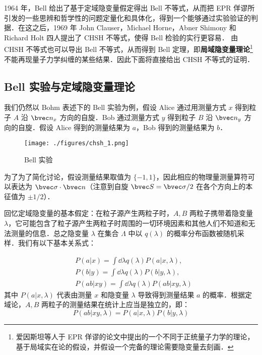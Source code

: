 

1964 年，Bell 给出了基于定域隐变量假定得出 Bell 不等式，从而把 EPR 佯谬所引发的一些思辨和哲学性的问题定量化和具体化，得到一个能够通过实验验证的判据．在这之后，1969 年 John Clauser，Michael Horne，Abner Shimony 和 Richard Holt 四人提出了 CHSH 不等式，使得 Bell 检验的实行更容易． 由 CHSH 不等式也可以导出 Bell 不等式，从而得到 Bell 定理，即\textbf{局域隐变量理论}\footnote{爱因斯坦等人于 EPR 佯谬的论文中提出的一个不同于正统量子力学的理论，基于局域实在论的假设，并假设一个完备的理论需要隐变量去刻画．}不能再现量子力学纠缠的某些结果．因此下面将直接给出 CHSH 不等式的证明．

\subsection{Bell 实验与定域隐变量理论}
我们仍然以 Bohm 表述下的 Bell 实验为例，假设 Alice 通过用测量方式 $x$ 得到粒子 $A$ 沿 $\bvec n_x$ 方向的自旋．Bob 通过测量方式 $y$ 得到粒子 $B$ 沿 $\bvec n_y$ 方向的自旋．假设 Alice 得到的测量结果为 $a$，Bob 得到的测量结果为 $b$．

\begin{figure}[ht]
\centering
\texttt{[image: ./figures/chsh\_1.png]}
\caption{Bell 实验} \label{chsh_fig1}
\end{figure}

为了为了简化讨论，假设测量结果取值为 $\{-1,1\}$，因此相应的物理量测量算符可以表达为 $\bvec \sigma \cdot \bvec n$（注意到自旋 $\bvec S=\bvec \sigma/2$ 在各个方向上的本征值为 $\pm 1/2$）．

回忆定域隐变量的基本假定：在粒子源产生两粒子时，$A,B$ 两粒子携带着隐变量 $\lambda$，它可能包含了粒子源产生两粒子时周围的一切环境因素和其他人们不知道和无法测量的信息．总之隐变量 $\lambda$ 在集合 $\Lambda$ 中以 $q(\lambda)$ 的概率分布函数被随机采样．我们有以下基本关系式：

\begin{equation}
\begin{aligned}
&P(a|x)=\int \dd \lambda q(\lambda)P(a|x,\lambda),\\
&P(b|y)=\int \dd \lambda q(\lambda)P(b|y,\lambda),\\
&P(ab|xy)=\int \dd \lambda q(\lambda)P(ab|xy,\lambda)
\end{aligned}
\end{equation}
其中 $P(a|x,\lambda)$ 代表由测量 $x$ 和隐变量 $\lambda$ 导致得到测量结果 $a$ 的概率．根据定域论，$A,B$ 两粒子的测量结果在统计上应当是独立的，即：
\begin{equation}
P(ab|xy,\lambda)=P(a|x,\lambda)P(b|y,\lambda)
\end{equation}
